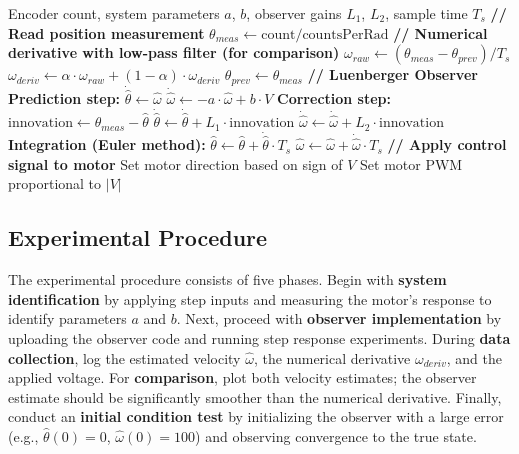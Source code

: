 \begin{algorithm}
\caption{Luenberger Observer Update (Timer ISR)}
\begin{algorithmic}[1]
\Require Encoder count, system parameters $a$, $b$, observer gains $L_1$, $L_2$, sample time $T_s$
\State \textbf{// Read position measurement}
\State $\theta_{meas} \leftarrow \text{count} / \text{countsPerRad}$
\State
\State \textbf{// Numerical derivative with low-pass filter (for comparison)}
\State $\omega_{raw} \leftarrow (\theta_{meas} - \theta_{prev}) / T_s$
\State $\omega_{deriv} \leftarrow \alpha \cdot \omega_{raw} + (1 - \alpha) \cdot \omega_{deriv}$ 
\State $\theta_{prev} \leftarrow \theta_{meas}$
\State
\State \textbf{// Luenberger Observer}
\State \textbf{Prediction step:}
\State $\dot{\hat{\theta}} \leftarrow \hat{\omega}$
\State $\dot{\hat{\omega}} \leftarrow -a \cdot \hat{\omega} + b \cdot V$
\State
\State \textbf{Correction step:}
\State $\text{innovation} \leftarrow \theta_{meas} - \hat{\theta}$
\State $\dot{\hat{\theta}} \leftarrow \dot{\hat{\theta}} + L_1 \cdot \text{innovation}$
\State $\dot{\hat{\omega}} \leftarrow \dot{\hat{\omega}} + L_2 \cdot \text{innovation}$
\State
\State \textbf{Integration (Euler method):}
\State $\hat{\theta} \leftarrow \hat{\theta} + \dot{\hat{\theta}} \cdot T_s$
\State $\hat{\omega} \leftarrow \hat{\omega} + \dot{\hat{\omega}} \cdot T_s$
\State
\State \textbf{// Apply control signal to motor}
\State Set motor direction based on sign of $V$
\State Set motor PWM proportional to $|V|$
\end{algorithmic}
\end{algorithm}

\subsection{Experimental Procedure}

The experimental procedure consists of five phases. Begin with \textbf{system identification} by applying step inputs and measuring the motor's response to identify parameters $a$ and $b$. Next, proceed with \textbf{observer implementation} by uploading the observer code and running step response experiments. During \textbf{data collection}, log the estimated velocity $\hat{\omega}$, the numerical derivative $\omega_{deriv}$, and the applied voltage. For \textbf{comparison}, plot both velocity estimates; the observer estimate should be significantly smoother than the numerical derivative. Finally, conduct an \textbf{initial condition test} by initializing the observer with a large error (e.g., $\hat{\theta}(0) = 0$, $\hat{\omega}(0) = 100$) and observing convergence to the true state.


